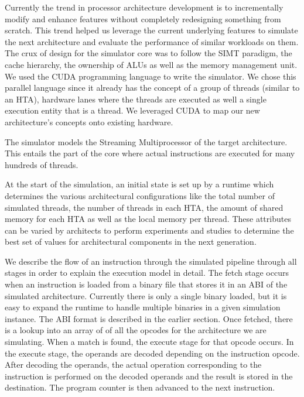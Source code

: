 \documentclass[conference, 10pt]{IEEEtran}
\begin{document}

Currently the trend in processor architecture development is to incrementally 
modify and enhance features without completely redesigning something from scratch. 
This trend helped us leverage the current underlying features to simulate the 
next architecture and evaluate the performance of similar workloads on them. 
The crux of design for the simulator core was to follow the SIMT paradigm, the 
cache hierarchy, the ownership of ALUs as well as the memory management unit. 
We used the CUDA programming language to write the simulator. We chose this 
parallel language since it already has the concept of a group of threads (similar 
to an HTA), hardware lanes where the threads are executed as well a single 
execution entity that is a thread. We leveraged CUDA to map our new architecture's 
concepts onto existing hardware. 

The simulator models the Streaming Multiprocessor of the target architecture. This
entails the part of the core where actual instructions are executed for many
hundreds of threads. 

At the start of the simulation, an initial state is set up by a runtime which 
determines the various architectural configurations like the total number of 
simulated threads, the number of threads in each HTA, the amount of shared 
memory for each HTA as well as the local memory per thread. These attributes 
can be varied by architects to perform experiments and studies to determine 
the best set of values for architectural components in the next generation. 

We describe the flow of an instruction through the simulated 
pipeline through all stages in order to explain the execution model in detail. 
The fetch stage occurs when an instruction is loaded from a binary file that 
stores it in an ABI of the simulated architecture. Currently there is only a 
single binary loaded, but it is easy to expand the runtime to handle multiple 
binaries in a given simulation instance. The ABI format is described in the earlier 
section. Once fetched, there is a lookup into an array of %
of all the opcodes for the architecture we are simulating. When a match is found, 
the execute stage for that opcode occurs. In the execute stage, the operands are 
decoded depending on the instruction opcode. After decoding the operands, the actual 
operation corresponding to the instruction is performed on the decoded operands and 
the result is stored in the destination. The program counter is then advanced to the 
next instruction. 
  
\end{document}
